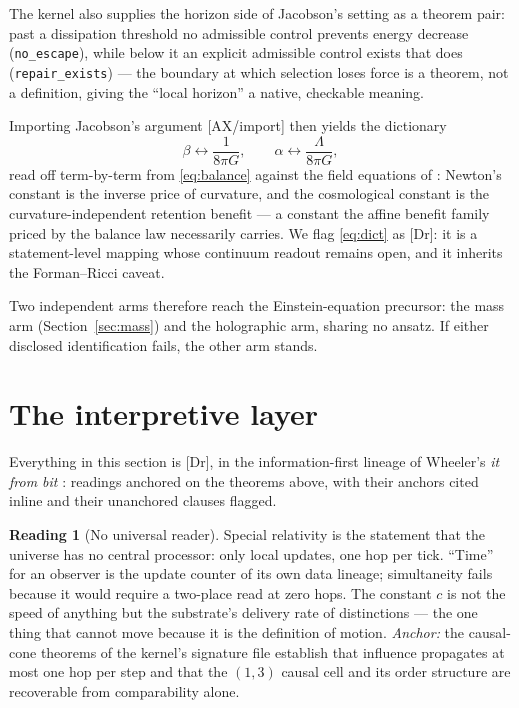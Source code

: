 \documentclass[10pt,twocolumn]{article}
\theoremstyle{definition}
\newtheorem{reading}{Reading}
\newcommand{\Dr}{\textsf{[Dr]}}
\newcommand{\Ax}{\textsf{[AX/import]}}
\newcommand{\code}[1]{\texttt{#1}}
\begin{document}
The kernel also supplies the horizon side of Jacobson's setting as a theorem pair:
past a dissipation threshold no admissible control prevents energy decrease
(\code{no\_escape}), while below it an explicit admissible control exists that does
(\code{repair\_exists}) --- the boundary at which selection loses force is a
theorem, not a definition, giving the ``local horizon'' a native, checkable meaning.

Importing Jacobson's argument \Ax{} then yields the dictionary
\begin{equation}
\beta \leftrightarrow \frac{1}{8\pi G},\qquad
\alpha \leftrightarrow \frac{\Lambda}{8\pi G},
\label{eq:dict}
\end{equation}
read off term-by-term from \eqref{eq:balance} against the field equations of
\cite{einstein1915}: Newton's constant is the inverse price
of curvature, and the cosmological constant is the curvature-independent retention
benefit --- a constant the affine benefit family priced by the balance law necessarily
carries. We flag \eqref{eq:dict} as \Dr{}: it is a
statement-level mapping whose continuum readout remains open, and it inherits the
Forman--Ricci caveat.

Two independent arms therefore reach the Einstein-equation precursor: the mass arm
(Section~\ref{sec:mass}) and the holographic arm, sharing no ansatz. If either
disclosed identification fails, the other arm stands.

\section{The interpretive layer}\label{sec:reading}

Everything in this section is \Dr{}, in the information-first lineage of
Wheeler's \emph{it from bit} \cite{wheeler}: readings anchored on the theorems above, with
their anchors cited inline and their unanchored clauses flagged.

\begin{reading}[No universal reader]
Special relativity \cite{einstein1905} is the statement that the universe has no central processor: only
local updates, one hop per tick. ``Time'' for an observer is the update counter of its
own data lineage; simultaneity fails because it would require a two-place read at zero
hops. The constant $c$ is not the speed of anything but the substrate's delivery rate
of distinctions --- the one thing that cannot move because it is the definition of
motion. \emph{Anchor:} the causal-cone theorems of the kernel's signature file
establish that influence propagates at most one hop per step and that the $(1,3)$
causal cell and its order structure are recoverable from comparability alone.
\end{reading}
\end{document}
